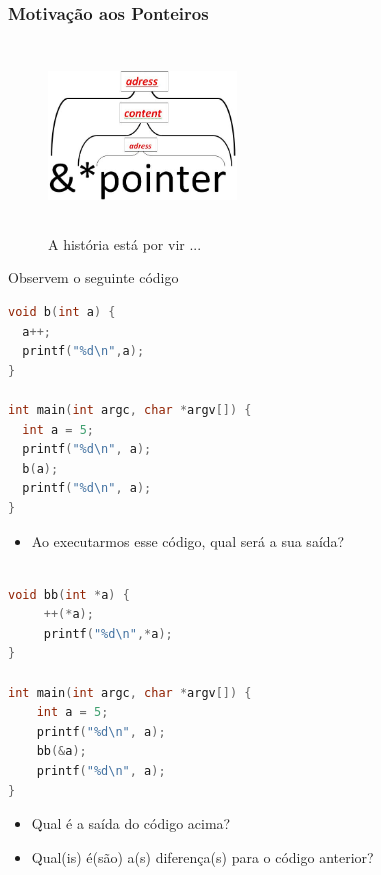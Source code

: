\begin{frame}[allowframebreaks=0.9]

\frametitle{Motivação aos Ponteiros}
\begin{figure}[ht]
  \begin{center}

\includegraphics[height=5cm, width=5cm]{figs/fig_ponteiros/hierarq_pointer.png}

    \caption{A história está por vir ...}
  \end{center}
\end{figure}

\end{frame}

\begin{frame}{Observem o seguinte código}

\begin{lstlisting}[language=C]
void b(int a) {
  a++;
  printf("%d\n",a);
}

int main(int argc, char *argv[]) {
  int a = 5;
  printf("%d\n", a);
  b(a);
  printf("%d\n", a);
}
\end{lstlisting}

\pause

\begin{itemize}
  \item Ao executarmos esse código, qual será a sua saída?
\end{itemize}
\end{frame}





\begin{frame}[c,fragile]{}
\begin{lstlisting}[language=C]

void bb(int *a) {
     ++(*a);
     printf("%d\n",*a);
}

int main(int argc, char *argv[]) {
    int a = 5;
    printf("%d\n", a);
    bb(&a);
    printf("%d\n", a);
}
\end{lstlisting}

\pause
\begin{itemize}
  \item Qual é a saída do código acima? 
  \item Qual(is) é(são) a(s) diferença(s) para o código anterior?
\end{itemize}
\end{frame}

